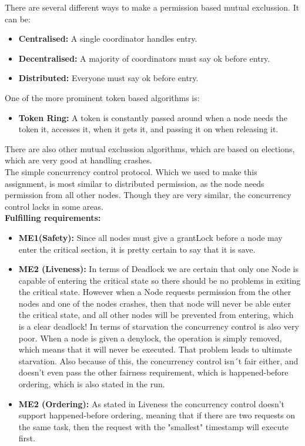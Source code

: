 There are several different ways to make a permission based mutual exclussion. It can be:
\begin{itemize}
\item \textbf{Centralised:} A single coordinator handles entry.
\item \textbf{Decentralised:} A majority of coordinators must say ok before entry.
\item \textbf{Distributed:} Everyone must say ok before entry. 
\end{itemize}  

One of the more prominent token based algorithms is:
\begin{itemize}
\item \textbf{Token Ring:} A token is constantly passed around when a node needs the token it, accesses it, when it gets it, and passing it on when releasing it. 
\end{itemize} 

There are also other mutual exclussion algorithms, which are based on elections, which are very good at handling crashes. \\

The simple concurrency control protocol. Which we used to make this assignment, is most similar to distributed permission, as the node needs permission from all other nodes. Though they are very similar, the concurrency control lacks in some areas. \\

\textbf{Fulfilling requirements:}
\begin{itemize} 
\item \textbf{ME1(Safety):} Since all nodes must give a grantLock before a node may enter the critical section, it is pretty certain to say that it is save. 
\item \textbf{ME2 (Liveness):} In terms of Deadlock we are certain that only one Node is capable of entering the critical state so there should be no problems in exiting the critical state. However when a Node requests permission from the other nodes and one of the nodes crashes, then that node will never be able enter the critical state, and all other nodes will be prevented from entering, which is a clear deadlock! In terms of starvation the concurrency control is also very poor. When a node is given a denylock, the operation is simply removed, which means that it will never be executed. That problem leads to ultimate starvation. Also because of this, the concurrency control isn´t fair either, and doesn’t even pass the other fairness requirement, which is happened-before ordering, which is also stated in the run.
\item \textbf{ME2 (Ordering):} As stated in Liveness the concurrency control doesn’t support happened-before ordering, meaning that if there are two requests on the same task, then the request with the "smallest" timestamp will execute first.
\end{itemize}

